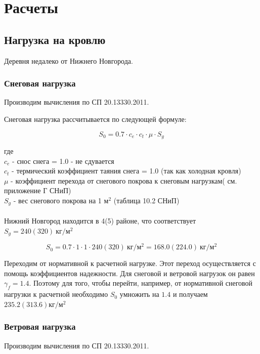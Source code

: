 \documentclass[10pt, twocolumn]{report}
\begin{document}
\part{Расчеты}

\chapter{Нагрузка на кровлю}

Деревня недалеко от Нижнего Новгорода.

\section{Снеговая нагрузка}

Производим вычисления по СП 20.13330.2011.

Снеговая нагрузка рассчитывается по следующей формуле:

$$ S_0 = 0.7 \cdot c_e \cdot c_t \cdot \mu \cdot S_g $$

где \\
\noindent
$c_e$ - снос снега = 1.0 - не сдувается \\
$c_t$ - термический коэффициент таяния снега = 1.0 (так как холодная кровля) \\
$\mu$ - коэффициент перехода от снегового покрова к снеговым нагрузкам( см. приложение Г СНиП) \\
$S_g$ - вес снегового покрова на 1 $\text{м}^2$ (таблица 10.2 СНиП)
\\ \\
\noindent Нижний Новгород находится в 4(5) районе, что соответствует $S_g = 240(320) \ \text{кг}/\text{м}^2$

$$ S_0 = 0.7 \cdot 1 \cdot 1 \cdot 240(320) \ \text{кг}/\text{м}^2 = 168.0(224.0) \ \text{кг}/\text{м}^2 $$


\noindent  Переходим от нормативной к расчетной нагрузке. Этот переход осуществляется с помощь коэффициентов надежности. Для снеговой и ветровой нагрузок он равен $\gamma_f = 1.4$. Поэтому для того, чтобы перейти, например, от нормативной снеговой нагрузки к расчетной необходимо $S_0$ умножить на $1.4$ и получаем $235.2(313.6) \text{кг}/\text{м}^2	$



\section{Ветровая нагрузка}

Производим вычисления по СП 20.13330.2011.
\end{document}
